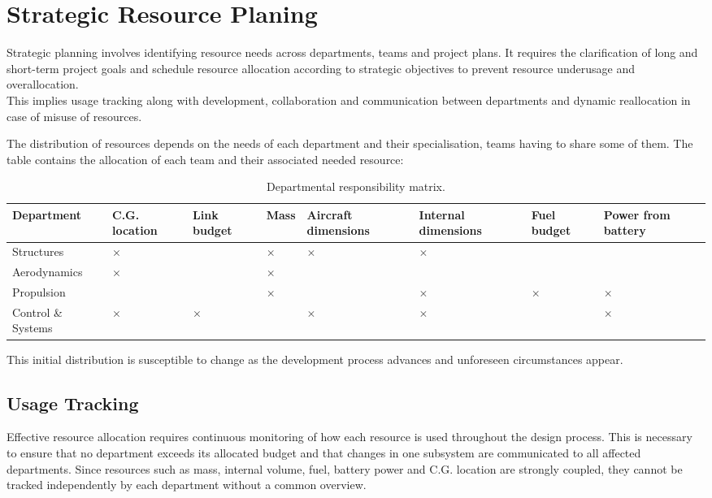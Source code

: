 \section{Strategic Resource Planing}
Strategic planning involves identifying resource needs across departments, teams and project plans. It requires the clarification of long and short-term project goals and schedule resource allocation according to strategic objectives to prevent resource underusage and overallocation. 
\\
This implies usage tracking along with development, collaboration and communication between departments and dynamic reallocation in case of misuse of resources.

The distribution of resources depends on the needs of each department and their specialisation, teams having to share some of them. The table contains the allocation of each team and their associated needed resource: 

\begin{table}[H]
\centering
\caption{Departmental responsibility matrix.}
\label{tab:responsibility_matrix}
\small
\begin{tabular}{|p{2.5cm}|p{1.7cm}|p{1.7cm}|p{1.2cm}|p{1.6cm}|p{1.7cm}|p{1.5cm}|p{1.7cm}|}
\hline 
\textbf{Department} 
& \textbf{C.G. location} 
& \textbf{Link budget} 
& \textbf{Mass} 
& \textbf{Aircraft dimensions} 
& \textbf{Internal dimensions} 
& \textbf{Fuel budget} 
& \textbf{Power from battery} \\
\hline \hline
Structures & $\times$ &  & $\times$ & $\times$ & $\times$ &  &  \\
\hline
Aerodynamics & $\times$ &  & $\times$ &  &  &  &  \\
\hline
Propulsion &  &  & $\times$ &  & $\times$ & $\times$ & $\times$ \\
\hline
Control \& Systems & $\times$ & $\times$ &  & $\times$ & $\times$ &  & $\times$ \\
\hline
\end{tabular}
\end{table}

This initial distribution is susceptible to change as the development process advances and unforeseen circumstances appear.

\subsection{Usage Tracking}
Effective resource allocation requires continuous monitoring of how each resource is used throughout the design process. This is necessary to ensure that no department exceeds its allocated budget and that changes in one subsystem are communicated to all affected departments. Since resources such as mass, internal volume, fuel, battery power and C.G. location are strongly coupled, they cannot be tracked independently by each department without a common overview.

